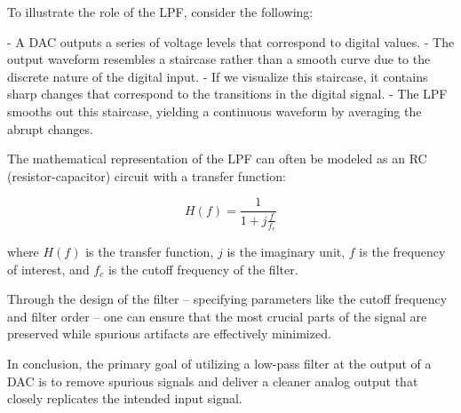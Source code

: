 To illustrate the role of the LPF, consider the following:

- A DAC outputs a series of voltage levels that correspond to digital values.
- The output waveform resembles a staircase rather than a smooth curve due to the discrete nature of the digital input.
- If we visualize this staircase, it contains sharp changes that correspond to the transitions in the digital signal.
- The LPF smooths out this staircase, yielding a continuous waveform by averaging the abrupt changes.

The mathematical representation of the LPF can often be modeled as an RC (resistor-capacitor) circuit with a transfer function: 

\[
H(f) = \frac{1}{1 + j\frac{f}{f_c}}
\]

where \(H(f)\) is the transfer function, \(j\) is the imaginary unit, \(f\) is the frequency of interest, and \(f_c\) is the cutoff frequency of the filter.

Through the design of the filter – specifying parameters like the cutoff frequency and filter order – one can ensure that the most crucial parts of the signal are preserved while spurious artifacts are effectively minimized. 

In conclusion, the primary goal of utilizing a low-pass filter at the output of a DAC is to remove spurious signals and deliver a cleaner analog output that closely replicates the intended input signal.

